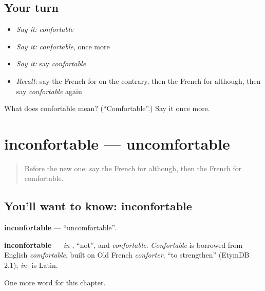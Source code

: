 \subsection*{Your turn}
\begin{itemize}
\raggedright
  \item \emph{Say it:} \emph{confortable}
  \item \emph{Say it:} \emph{confortable}, once more
  \item \emph{Say it:} say \emph{confortable}
  \item \emph{Recall:} say the French for on the contrary, then the French for although, then say \emph{confortable} again
\end{itemize}

\begin{tcolorbox}[breakable,colback=teal!4,colframe=teal!35!black,title={Before you move on}]
What does confortable mean? (\textquotedblleft{}Comfortable\textquotedblright{}.) Say it once more.
\end{tcolorbox}
\section[inconfortable]{inconfortable — uncomfortable}

\label{lesson:FR-C159-inconfortable}



\begin{quote}
Before the new one: say the French for although, then the French for comfortable.
\end{quote}

\subsection*{You'll want to know: inconfortable}
\textbf{inconfortable} — \textquotedblleft{}uncomfortable\textquotedblright{}.

\begin{cousinweb}
\textbf{inconfortable} — \emph{in-}, \textquotedblleft{}not\textquotedblright{}, and \emph{confortable}. \emph{Confortable} is borrowed from English \emph{comfortable}, built on Old French \emph{conforter}, \textquotedblleft{}to strengthen\textquotedblright{} (EtymDB 2.1); \emph{in-} is Latin.
\end{cousinweb}

\begin{grammarlens}[title={What you've built}]
One more word for this chapter.
\end{grammarlens}

